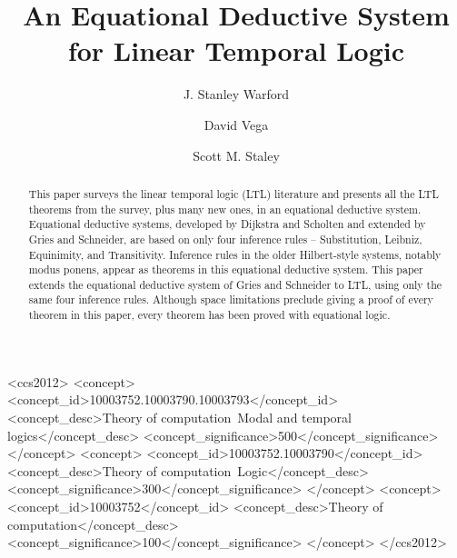 \documentclass[format=acmsmall, review=false, screen=true, fleqn]{acmart}
\begin{document}
\title{An Equational Deductive System for Linear Temporal Logic}

\author{J. Stanley Warford}
\author{David Vega}
\author{Scott M. Staley}

\begin{abstract}
This paper surveys the linear temporal logic (LTL) literature and presents all the LTL theorems from the survey, plus many new ones, in an equational deductive system.
Equational deductive systems, developed by Dijkstra and Scholten and extended by Gries and Schneider, are based on only four inference rules -- Substitution, Leibniz, Equinimity, and Transitivity.
Inference rules in the older Hilbert-style systems, notably modus ponens, appear as theorems in this equational deductive system.
This paper extends the equational deductive system of Gries and Schneider to LTL, using only the same four inference rules.
Although space limitations preclude giving a proof of every theorem in this paper, every theorem has been proved with equational logic.\end{abstract}

%
%
\begin{CCSXML}
<ccs2012>
<concept>
<concept_id>10003752.10003790.10003793</concept_id>
<concept_desc>Theory of computation~Modal and temporal logics</concept_desc>
<concept_significance>500</concept_significance>
</concept>
<concept>
<concept_id>10003752.10003790</concept_id>
<concept_desc>Theory of computation~Logic</concept_desc>
<concept_significance>300</concept_significance>
</concept>
<concept>
<concept_id>10003752</concept_id>
<concept_desc>Theory of computation</concept_desc>
<concept_significance>100</concept_significance>
</concept>
</ccs2012>
\end{CCSXML}

%
%


\maketitle


\end{document}
